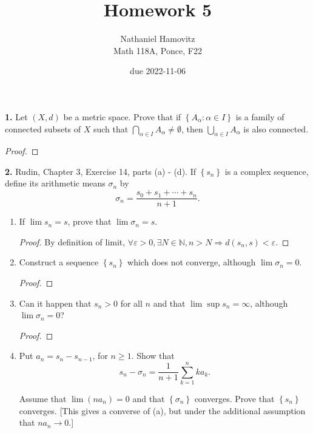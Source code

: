 \documentclass{article}
\newcommand{\N}{\mathbb{N}}
\newcommand{\set}[1]{\left\{ #1 \right\}}
\begin{document}
\renewcommand{\labelenumi}{(\alph{enumi})}


\title{Homework 5} %
\author{Nathaniel Hamovitz\\Math 118A, Ponce, F22}
\date{due 2022-11-06}

\maketitle

\textbf{1. }
Let $(X, d)$ be a metric space. Prove that if $\set{A_\alpha : \alpha \in I}$ is a family of connected subsets of $X$ such that $\displaystyle \bigcap_{\alpha \in I} A_\alpha \ne \emptyset$, then $\displaystyle \bigcup_{\alpha \in I} A_\alpha$ is also connected.

\begin{proof}
    
\end{proof}

\newpage %


\textbf{2. }
Rudin, Chapter 3, Exercise 14, parts (a) - (d). If $\set{s_n}$ is a complex sequence, define its arithmetic means $\sigma_n$ by
$$\sigma_n = \frac{s_0 + s_1 + \cdots + s_n}{n + 1}.$$

\begin{enumerate}
    \item 
    If $\lim s_n = s$, prove that $\lim \sigma_n = s$.
    \begin{proof}
        By definition of limit, $\forall \varepsilon > 0, \exists N \in \N, n > N \Rightarrow d(s_n, s) < \varepsilon$. 
        
    \end{proof}


    \item 
    Construct a sequence $\set{s_n}$ which does not converge, although $\lim \sigma_n = 0$.
    \begin{proof}
        
    \end{proof}


    \item
    Can it happen that $s_n > 0$ for all $n$ and that $\lim \sup s_n = \infty$, although $\lim \sigma_n = 0$?
    \begin{proof}
        
    \end{proof}


    \item
    Put $a_n = s_n - s_{n - 1}$, for $n \ge 1$. Show that
    $$s_n - \sigma_n = \frac{1}{n + 1} \sum_{k = 1}^n k a_k.$$

    Assume that $\lim (n a_n) = 0$ and that $\set{\sigma_n}$ converges. Prove that $\set{s_n}$ converges. [This gives a converse of (a), but under the additional assumption that $n a_n \to 0$.]
\end{enumerate}
\end{document}
